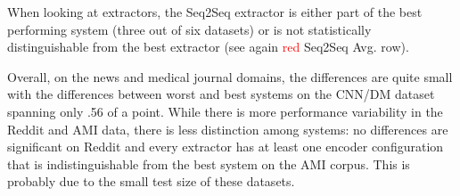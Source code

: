

When looking at extractors, the Seq2Seq extractor is either part of 
the best performing system (three out of six datasets) or is not 
statistically distinguishable from the best extractor (see again 
\textcolor{red}{red} Seq2Seq Avg. row). 

Overall, on the news and medical journal domains, the differences are 
quite small with the 
differences between worst and best systems on the CNN/DM dataset 
spanning only .56 of a \rouge{} point. While there is more performance variability
 in the Reddit and AMI data, there is less distinction among systems: 
 no differences are significant on Reddit
and every extractor has at least one encoder configuration that is indistinguishable
from the best system on the AMI corpus. This is probably due to the small test
size of these datasets.










 
